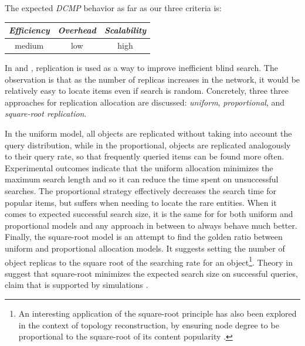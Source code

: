 The expected \emph{DCMP} behavior as far as our three criteria is:
%
\begin{center}
{\footnotesize
\begin{tabular}{ccc}
\emph{Efficiency} & \emph{Overhead} & \emph{Scalability} \\
\hline
medium &
low &
high
\end{tabular}
}
\end{center}



In \cite{CS2002} and \cite{LCCLS2002}, replication is used as a way to improve
inefficient blind search. The observation is that as the number of replicas
increases in the network, it would be relatively easy to locate items even if
search is random. Concretely, three three approaches for replication allocation
are discussed: \emph{uniform}, \emph{proportional}, and
\emph{square-root replication}.

In the uniform model, all objects are replicated without taking into account
the query distribution,
while in the proportional, objects are replicated analogously to their query
rate, so that frequently queried items can be found more often. Experimental
outcomes indicate that the uniform allocation minimizes the maximum search
length and so it can reduce the time spent on unsuccessful searches. The
proportional strategy effectively decreases the search time for popular items,
but suffers when needing to locate the rare entities. When it comes to expected
successful search size, it is the same for for both uniform and proportional
models and any approach in between to always behave much better. Finally, the
square-root model is an attempt to find the golden ratio between uniform and
proportional allocation models. It suggests setting the number of object
replicas to the square root of the searching rate for an object\footnote{An
interesting application of the square-root principle has also been explored
in the context of topology reconstruction, by ensuring node degree to be
proportional to the square-root of its content popularity \cite{C2005}.}.
Theory in \cite{CS2002} suggest that square-root minimizes the expected search size on
successful queries, claim that is supported by simulations \cite{LCCLS2002}.  

